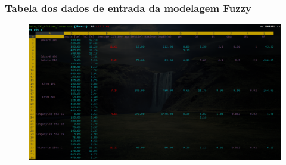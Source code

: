 \documentclass[aspectratio=169]{beamer} %
\begin{document}
{{
\begin{frame}
\frametitle{Tabela dos dados de entrada da modelagem Fuzzy}
\begin{figure}
\centering
\includegraphics[scale=0.25]{entradas_fuzzy.png}
\end{figure}
\end{frame} 
}

}
\end{document}
